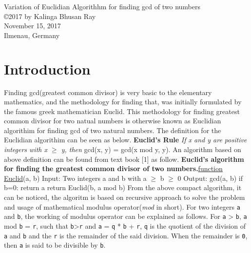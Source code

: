 \documentclass[12pt]{article}
\begin{document}
\begin{center}
{\large Variation of Euclidian Algorithhm for finding gcd of two numbers} \\
\copyright 2017 by Kalinga Bhusan Ray \\
November 15, 2017 \\
Ilmenau, Germany \\
\author{Kalinga Bhusan Ray}
\end{center}

\section{Introduction}
Finding gcd(greatest common divisor) is very basic to the elementary mathematics, 
and the methodology for finding that, was initially formulated by the famous greek mathematician Euclid. This methodology for finding greatest common divisor for two natual numbers is otherwise known as Euclidian algorithim for finding gcd of two 
natural numbers. The definition for the Euclidian algorithim can be seen as below.
\newline \newline \textbf {Euclid's Rule} \textit {If x and y are positive integers with x $\geq$ y,
 then} \break \vspace{0mm} \hspace{4cm} gcd(x, y) = gcd(x mod y, y).
\newline 
\newline An algorithm based on above definition can be found from text book [1] as follow.
\newline \textbf {Euclid's algorithm for finding the greatest common divisor of two numbers.}\newline \underline {function Euclid}(a, b)
\newline Input: Two integers a and b with a $\geq$ b $\geq$ 0 
\newline Output: gcd(a, b)
\newline
\newline if b=0: return a
\newline return Euclid(b, a mod b)
\newline 
\newline From the above compact algorithm, it can be noticed, the algoritm is based on recursive approach to solve the problem and usage of mathematical modulus operator(\textit {mod} in short).
For two integers \texttt{a} and \texttt{b}, the working of modulus operator can be explained as follows.
For \texttt{a} > \texttt{b}, \texttt{a} mod \texttt{b} = \texttt{r},  such that \texttt{b}>\texttt{r} and  \texttt{a} = \texttt{q} * \texttt{b} + \texttt{r}, \texttt{q} is the quotient of the division of \texttt{a} and \texttt{b} and the \texttt{r} is the remainder of the said division. When the remainder is \texttt{0}, then \texttt{a} is said to be divisible by \texttt{b}.
\end{document}
